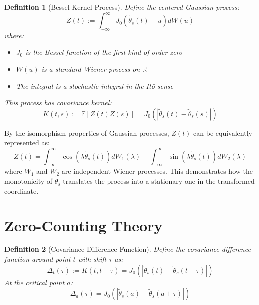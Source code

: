 \documentclass{article}
\newcommand{\assign}{:=}
\newtheorem{definition}{Definition}
\begin{document}
\begin{definition}
  [Bessel Kernel Process] Define the centered Gaussian process:
  \begin{equation}
    Z (t) \assign \int_{- \infty}^{\infty} J_0  (\tilde{\theta}_s (t) - u) dW
    (u)
  \end{equation}
  where:
  \begin{itemize}
    \item $J_0$ is the Bessel function of the first kind of order zero
    
    \item $W (u)$ is a standard Wiener process on $\mathbb{R}$
    
    \item The integral is a stochastic integral in the It{\^o} sense
  \end{itemize}
  This process has covariance kernel:
  \begin{equation}
    K (t, s) \assign \mathbb{E} [Z (t) Z (s)] = J_0 (| \tilde{\theta}_s (t) -
    \tilde{\theta}_s (s) |)
  \end{equation}
\end{definition}

\begin{remark}
  By the isomorphism properties of Gaussian processes, $Z (t)$ can be
  equivalently represented as:
  \begin{equation}
    Z (t) = \int_{- \infty}^{\infty} \cos (\lambda \tilde{\theta}_s (t)) dW_1
    (\lambda) + \int_{- \infty}^{\infty} \sin (\lambda \tilde{\theta}_s (t))
    dW_2 (\lambda)
  \end{equation}
  where $W_1$ and $W_2$ are independent Wiener processes. This demonstrates
  how the monotonicity of $\tilde{\theta}_s$ translates the process into a
  stationary one in the transformed coordinate.
\end{remark}

\section{Zero-Counting Theory}

\begin{definition}
  [Covariance Difference Function] Define the covariance difference function
  around point $t$ with shift $\tau$ as:
  \begin{equation}
    \Delta_t (\tau) \assign K (t, t + \tau) = J_0 (| \tilde{\theta}_s (t) -
    \tilde{\theta}_s (t + \tau) |)
  \end{equation}
  At the critical point $a$:
  \begin{equation}
    \Delta_a (\tau) = J_0 (| \tilde{\theta}_s (a) - \tilde{\theta}_s (a +
    \tau) |)
  \end{equation}
\end{definition}
\end{document}
